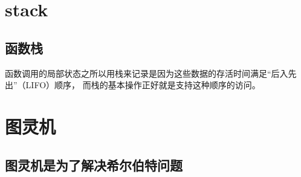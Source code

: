 \documentclass[UTF8]{ctexart}
\begin{document}
\section{stack}
\subsection{函数栈}
函数调用的局部状态之所以用栈来记录是因为这些数据的存活时间满足“后入先出”（LIFO）顺序，
而栈的基本操作正好就是支持这种顺序的访问。

\section{图灵机}
\subsection{图灵机是为了解决希尔伯特问题}
\end{document}
